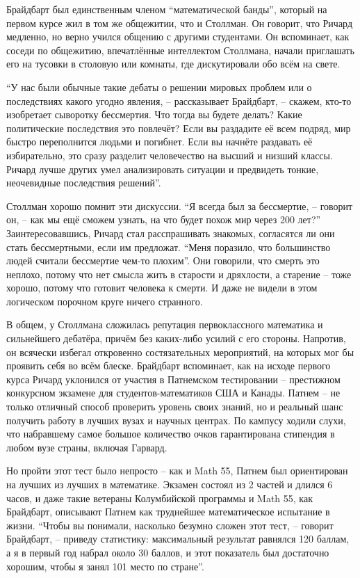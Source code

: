 Брайдбарт был единственным членом \enquote{математической банды}, который на первом курсе жил в том же общежитии, что и Столлман. Он говорит, что Ричард медленно, но верно учился общению с другими студентами. Он вспоминает, как соседи по общежитию, впечатлённые интеллектом Столлмана, начали приглашать его на тусовки в столовую или комнаты, где дискутировали обо всём на свете.

\enquote{У нас были обычные такие дебаты о решении мировых проблем или о последствиях какого угодно явления, -- рассказывает Брайдбарт, -- скажем, кто-то изобретает сыворотку бессмертия. Что тогда вы будете делать? Какие политические последствия это повлечёт? Если вы раздадите её всем подряд, мир быстро переполнится людьми и погибнет. Если вы начнёте раздавать её избирательно, это сразу разделит человечество на высший и низший классы. Ричард лучше других умел анализировать ситуации и предвидеть тонкие, неочевидные последствия решений}.

Столлман хорошо помнит эти дискуссии. \enquote{Я всегда был за бессмертие, -- говорит он, -- как мы ещё сможем узнать, на что будет похож мир через 200 лет?} Заинтересовавшись, Ричард стал расспрашивать знакомых, согласятся ли они стать бессмертными, если им предложат. \enquote{Меня поразило, что большинство людей считали бессмертие чем-то плохим}. Они говорили, что смерть это неплохо, потому что нет смысла жить в старости и дряхлости, а старение -- тоже хорошо, потому что готовит человека к смерти. И даже не видели в этом логическом порочном круге ничего странного.

В общем, у Столлмана сложилась репутация первоклассного математика и сильнейшего дебатёра, причём без каких-либо усилий с его стороны. Напротив, он всячески избегал откровенно состязательных мероприятий, на которых мог бы проявить себя во всём блеске. Брайдбарт вспоминает, как на исходе первого курса Ричард уклонился от участия в Патнемском тестировании -- престижном конкурсном экзамене для студентов-математиков США и Канады. Патнем -- не только отличный способ проверить уровень своих знаний, но и реальный шанс получить работу в лучших вузах и научных центрах. По кампусу ходили слухи, что набравшему самое большое количество очков гарантирована стипендия в любом вузе страны, включая Гарвард.

Но пройти этот тест было непросто -- как и Math 55, Патнем был ориентирован на лучших из лучших в математике. Экзамен состоял из 2 частей и длился 6 часов, и даже такие ветераны Колумбийской программы и Math 55, как Брайдбарт, описывают Патнем как труднейшее математическое испытание в жизни. \enquote{Чтобы вы понимали, насколько безумно сложен этот тест, -- говорит Брайдбарт, -- приведу статистику: максимальный результат равнялся 120 баллам, а я в первый год набрал около 30 баллов, и этот показатель был достаточно хорошим, чтобы я занял 101 место по стране}.

